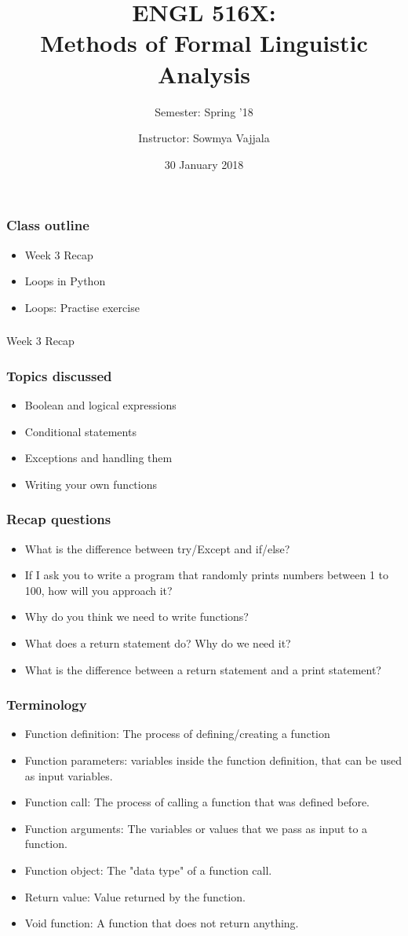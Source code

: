 \documentclass{beamer}
\author[Sowmya Vajjala]{Instructor: Sowmya Vajjala}
\title[ENGL 516X]{ENGL 516X: \\ Methods of Formal Linguistic Analysis}
\subtitle{Semester: Spring '18}
\date{30 January 2018}
\institute{Iowa State University, USA}
\begin{document}
\begin{frame}\titlepage
\end{frame}

\begin{frame}%
\frametitle{Class outline}
\begin{itemize}
\item Week 3 Recap
\item Loops in Python
\item Loops: Practise exercise
\end{itemize}
\end{frame}

\begin{frame}%
\frametitle{}
\centering Week 3 Recap
\end{frame}

\begin{frame}%
\frametitle{Topics discussed}
\begin{itemize}
\item Boolean and logical expressions
\item Conditional statements
\item Exceptions and handling them
\item Writing your own functions
\end{itemize}
\end{frame}

\begin{frame}
\frametitle{Recap questions}
\begin{itemize}
\item What is the difference between try/Except and if/else? \pause
\item If I ask you to write a program that randomly prints numbers between 1 to 100, how will you approach it? \pause
\item Why do you think we need to write functions? \pause
\item What does a return statement do? Why do we need it? \pause
\item What is the difference between a return statement and a print statement?
\end{itemize}
\end{frame}

\begin{frame}
\frametitle{Terminology} %
\begin{itemize}
\item Function definition: The process of defining/creating a function
\item Function parameters: variables inside the function definition, that can be used as input variables. 
\item Function call: The process of calling a function that was defined before.
\item Function arguments: The variables or values that we pass as input to a function.
\item Function object: The "data type" of a function call. 
\item Return value: Value returned by the function.
\item Void function: A function that does not return anything. 
\end{itemize}
\end{frame}
\end{document}
